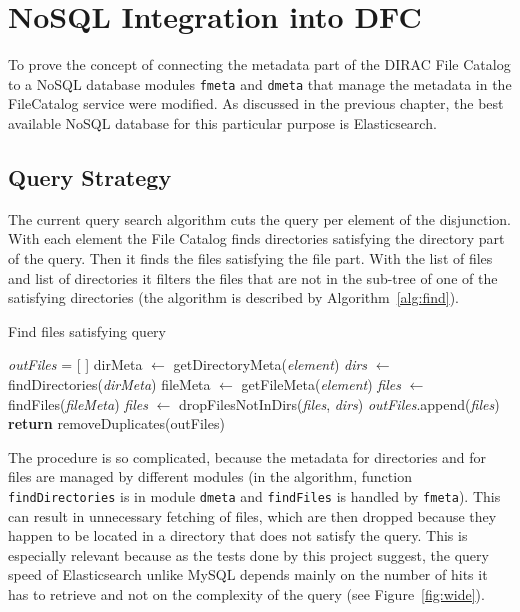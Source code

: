 \chapter{NoSQL Integration into DFC}
\label{chap:NoSQL}

To prove the concept of connecting the metadata part of the DIRAC File Catalog to a NoSQL database 
modules \texttt{fmeta} and \texttt{dmeta} that manage the metadata in the FileCatalog service were modified.
As discussed in the previous chapter, the best available NoSQL database for this particular purpose is 
Elasticsearch. 

\section{Query Strategy}
The current query search algorithm cuts the query per element of the disjunction. With each element the File Catalog
finds directories satisfying the directory part of the query. Then it finds the files satisfying the file part. 
With the list of files and list of directories it filters the files that are not in the sub-tree of one of the
satisfying directories (the algorithm is described by Algorithm~\ref{alg:find}).

\begin{algorithm}[h]
\caption{Find files satisfying query}
\label{alg:find}
\begin{algorithmic}[1]
	\State \textit{outFiles} = [  ]
		\State dirMeta $\leftarrow$ getDirectoryMeta(\textit{element})
		\State \textit{dirs} $\leftarrow$ findDirectories(\textit{dirMeta}) 
		\State fileMeta $\leftarrow$ getFileMeta(\textit{element})
		\State \textit{files} $\leftarrow$ findFiles(\textit{fileMeta})
		\State \textit{files} $\leftarrow$ dropFilesNotInDirs(\textit{files}, \textit{dirs})
		\State \textit{outFiles}.append(\textit{files})
	\EndFor
	\State \textbf{return} removeDuplicates(outFiles)
\EndFunction
\end{algorithmic}
\end{algorithm}

The procedure is so complicated, because the metadata for directories and for files are managed by different 
modules (in the algorithm, function \texttt{findDirectories} is in module \texttt{dmeta} and \texttt{findFiles} 
is handled by \texttt{fmeta}). This can result in unnecessary fetching of files, which are then dropped because
they happen to be located in a directory that does not satisfy the query. This is especially relevant because as
the tests done by this project suggest, the query speed of Elasticsearch unlike MySQL depends mainly on the
number of hits it has to retrieve and
not on the complexity of the query (see Figure~\ref{fig:wide}). 

